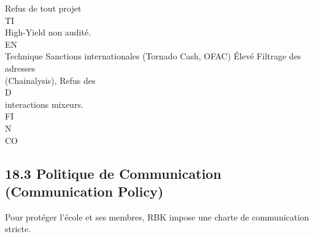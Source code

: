 \documentclass[12pt,landscape,a4paper]{article}
\begin{document}
Refus de tout projet\\
\vspace{0.5em}
\vspace{0.5em}
\vspace{0.5em}
\vspace{0.5em}
TI\\
High-Yield non audité.\\
\vspace{0.5em}
\vspace{0.5em}
\vspace{0.5em}
\vspace{0.5em}
EN\\
Technique     Sanctions internationales (Tornado Cash, OFAC)                    Élevé   Filtrage des adresses\\
(Chainalysis), Refus des\\
\vspace{0.5em}
\vspace{0.5em}
\vspace{0.5em}
\vspace{0.5em}
D\\
interactions mixeurs.\\
\vspace{0.5em}
\vspace{0.5em}
\vspace{0.5em}
\vspace{0.5em}
FI\\
N\\
CO\\
\subsection{18.3 Politique de Communication (Communication Policy)}
Pour protéger l’école et ses membres, RBK impose une charte de communication stricte.\\
\vspace{0.5em}
\vspace{0.5em}
\end{document}
